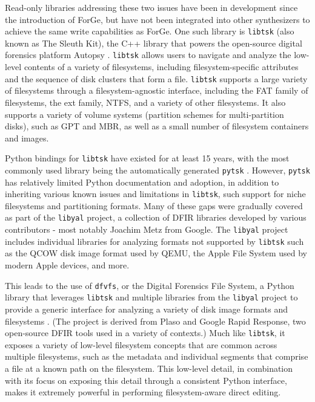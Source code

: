 \documentclass[letterpaper,12pt]{report}
\newcommand{\passthrough}[1]{#1}
\begin{document}
Read-only libraries addressing these two issues have been in development
since the introduction of ForGe, but have not been integrated into other
synthesizers to achieve the same write capabilities as ForGe. One such
library is \passthrough{\lstinline!libtsk!} (also known as The Sleuth
Kit), the C++ library that powers the open-source digital forensics
platform Autopsy \cite{SleuthkitSleuthkit2025}.
\passthrough{\lstinline!libtsk!} allows users to navigate and analyze
the low-level contents of a variety of filesystems, including
filesystem-specific attributes and the sequence of disk clusters that
form a file. \passthrough{\lstinline!libtsk!} supports a large variety
of filesystems through a filesystem-agnostic interface, including the
FAT family of filesystems, the ext family, NTFS, and a variety of other
filesystems. It also supports a variety of volume systems (partition
schemes for multi-partition disks), such as GPT and MBR, as well as a
small number of filesystem containers and images.

Python bindings for \passthrough{\lstinline!libtsk!} have existed for at
least 15 years, with the most commonly used library being the
automatically generated \passthrough{\lstinline!pytsk!}
\cite{Py4n6Pytsk2025}. However, \passthrough{\lstinline!pytsk!} has
relatively limited Python documentation and adoption, in addition to
inheriting various known issues and limitations in
\passthrough{\lstinline!libtsk!}, such support for niche filesystems and
partitioning formats. Many of these gaps were gradually covered as part
of the \passthrough{\lstinline!libyal!} project, a collection of DFIR
libraries developed by various contributors - most notably Joachim Metz
from Google. The \passthrough{\lstinline!libyal!} project includes
individual libraries for analyzing formats not supported by
\passthrough{\lstinline!libtsk!} such as the QCOW disk image format used
by QEMU, the Apple File System used by modern Apple devices, and more.

This leads to the use of \passthrough{\lstinline!dfvfs!}, or the Digital
Forensics File System, a Python library that leverages
\passthrough{\lstinline!libtsk!} and multiple libraries from the
\passthrough{\lstinline!libyal!} project to provide a generic interface
for analyzing a variety of disk image formats and filesystems
\cite{Log2timelineDfvfs2025}. (The project is derived from Plaso and
Google Rapid Response, two open-source DFIR tools used in a variety of
contexts.) Much like \passthrough{\lstinline!libtsk!}, it exposes a
variety of low-level filesystem concepts that are common across multiple
filesystems, such as the metadata and individual segments that comprise
a file at a known path on the filesystem. This low-level detail, in
combination with its focus on exposing this detail through a consistent
Python interface, makes it extremely powerful in performing
filesystem-aware direct editing.
\end{document}

